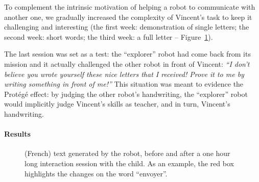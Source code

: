 \documentclass{article}
\begin{document}
To complement the intrinsic motivation of helping a robot to communicate with another one, we
gradually increased the complexity of Vincent's task to keep it challenging and
interesting (the first week: demonstration of single letters; the second week:
short words; the third week: a full letter -- Figure~\ref{fig:stimuli}).

The last session was set as a test: the ``explorer'' robot
had come back from its mission and it actually challenged the other robot in
front of Vincent: \emph{``I don't believe you wrote yourself these nice letters that I
received! Prove it to me by writing something in front of me!''} This situation
was meant to evidence the Prot\'eg\'e effect: by judging the other robot's
handwriting, the ``explorer'' robot would implicitly judge Vincent's skills as
teacher, and in turn, Vincent's handwriting.

\paragraph{Results}

\begin{figure}
    \centering

    \caption{\small (French) text generated by the robot, before and after a one
        hour long interaction session with the child. As an example, the red box
        highlights the changes on the word ``envoyer''.}

    \label{fig:stimuli}
\end{figure}
\end{document}
